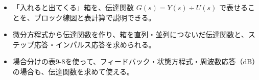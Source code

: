 \newcommand\kixibox[1]{\par\addvspace{3pt}\noindent\textbf{#1}\par\vspace{3pt}\noindent\ignorespaces}
\newcommand\kixiline[1]{\par\addvspace{3pt}{\centering #1\par}\addvspace{3pt}\noindent\ignorespaces}
\newcommand\kixiframe[2][100mm]{\par\addvspace{4pt}{\centering\tikz\node[draw=\bkTT, line width=0.9pt, fill=bkTheme!6, rounded corners=1.5mm, inner xsep=6mm, inner ysep=2.5mm, align=center]{#2};\par}\addvspace{4pt}\noindent\ignorespaces}
\newcommand\kixia{\par\vspace{2pt}\noindent\rightskip=0pt plus 8em\relax\hangindent=2.6\zw\hangafter=0\relax}
\newcommand\kixib{\par\vspace{2pt}\noindent\rightskip=0pt plus 8em\relax\hangindent=4.3\zw\hangafter=0\relax}
\newcommand\kixis{\rightskip=0pt plus 8em\relax}
\newcommand\kixipm[3]{\node[font=\footnotesize, text=bkInk, inner sep=0.3mm] at ($#1+#2$) {$#3$};}
\makeatother


\begin{goal}
\begin{itemize}[label={\color{\bkTT}●}, leftmargin=1.6\zw, itemsep=0pt, topsep=1pt]
\item {}\enspace 「入れると出てくる」箱を、伝達関数 $G(s)=Y(s)\div U(s)$ で表せることを、ブロック線図と表計算で説明できる。
\item {}\enspace 微分方程式から伝達関数を作り、箱を直列・並列につないだ伝達関数と、ステップ応答・インパルス応答を求められる。
\item {}\enspace 場合分けの表9-8を使って、フィードバック・状態方程式・周波数応答（dB）の場合も、伝達関数を求めて使える。
\end{itemize}
\end{goal}


